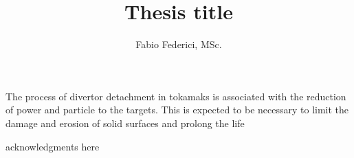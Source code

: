 \documentclass[]{yorkThesis}  %
\title{Thesis title}
\author{Fabio Federici, MSc.}
\begin{document}
\titlePage
\abstract
{}
The process of divertor detachment in tokamaks is associated with the reduction of power and particle to the targets. This is expected to be necessary to limit the damage and erosion of solid surfaces and prolong the life 

\contents

\acknowledgments
{}
acknowledgments here

\declaration
\end{document}
